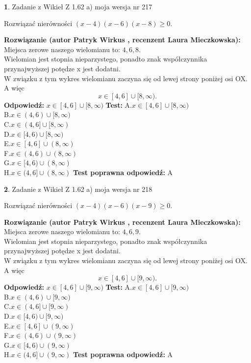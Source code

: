 \documentclass[12pt, a4paper]{article}
\theoremstyle{definition} %
\newtheorem{zad}{}
\newcommand{\zadStart}[1]{\begin{zad}#1\newline}
\newcommand{\zadStop}{\end{zad}}
\newcommand{\rozwStart}[2]{\noindent \textbf{Rozwiązanie (autor #1 , recenzent #2): }\newline}
\newcommand{\rozwStop}{\newline}
\newcommand{\odpStart}{\noindent \textbf{Odpowiedź:}\newline}
\newcommand{\odpStop}{\newline}
\newcommand{\testStart}{\noindent \textbf{Test:}\newline}
\newcommand{\testStop}{\newline}
\newcommand{\kluczStart}{\noindent \textbf{Test poprawna odpowiedź:}\newline}
\newcommand{\kluczStop}{\newline}
\begin{document}
\zadStart{Zadanie z Wikieł Z 1.62 a) moja wersja nr 217}

Rozwiązać nierówności $(x-4)(x-6)(x-8)\ge0$.
\zadStop
\rozwStart{Patryk Wirkus}{Laura Mieczkowska}
Miejsca zerowe naszego wielomianu to: $4, 6, 8$.\\
Wielomian jest stopnia nieparzystego, ponadto znak współczynnika przy\linebreak najwyższej potędze x jest dodatni.\\ W związku z tym wykres wielomianu zaczyna się od lewej strony poniżej osi OX. A więc $$x \in [4,6] \cup [8,\infty).$$
\rozwStop
\odpStart
$x \in [4,6] \cup [8,\infty)$
\odpStop
\testStart
A.$x \in [4,6] \cup [8,\infty)$\\
B.$x \in (4,6) \cup [8,\infty)$\\
C.$x \in (4,6] \cup [8,\infty)$\\
D.$x \in [4,6) \cup [8,\infty)$\\
E.$x \in [4,6] \cup (8,\infty)$\\
F.$x \in (4,6) \cup (8,\infty)$\\
G.$x \in [4,6) \cup (8,\infty)$\\
H.$x \in (4,6] \cup (8,\infty)$
\testStop
\kluczStart
A
\kluczStop



\zadStart{Zadanie z Wikieł Z 1.62 a) moja wersja nr 218}

Rozwiązać nierówności $(x-4)(x-6)(x-9)\ge0$.
\zadStop
\rozwStart{Patryk Wirkus}{Laura Mieczkowska}
Miejsca zerowe naszego wielomianu to: $4, 6, 9$.\\
Wielomian jest stopnia nieparzystego, ponadto znak współczynnika przy\linebreak najwyższej potędze x jest dodatni.\\ W związku z tym wykres wielomianu zaczyna się od lewej strony poniżej osi OX. A więc $$x \in [4,6] \cup [9,\infty).$$
\rozwStop
\odpStart
$x \in [4,6] \cup [9,\infty)$
\odpStop
\testStart
A.$x \in [4,6] \cup [9,\infty)$\\
B.$x \in (4,6) \cup [9,\infty)$\\
C.$x \in (4,6] \cup [9,\infty)$\\
D.$x \in [4,6) \cup [9,\infty)$\\
E.$x \in [4,6] \cup (9,\infty)$\\
F.$x \in (4,6) \cup (9,\infty)$\\
G.$x \in [4,6) \cup (9,\infty)$\\
H.$x \in (4,6] \cup (9,\infty)$
\testStop
\kluczStart
A
\kluczStop
\end{document}
